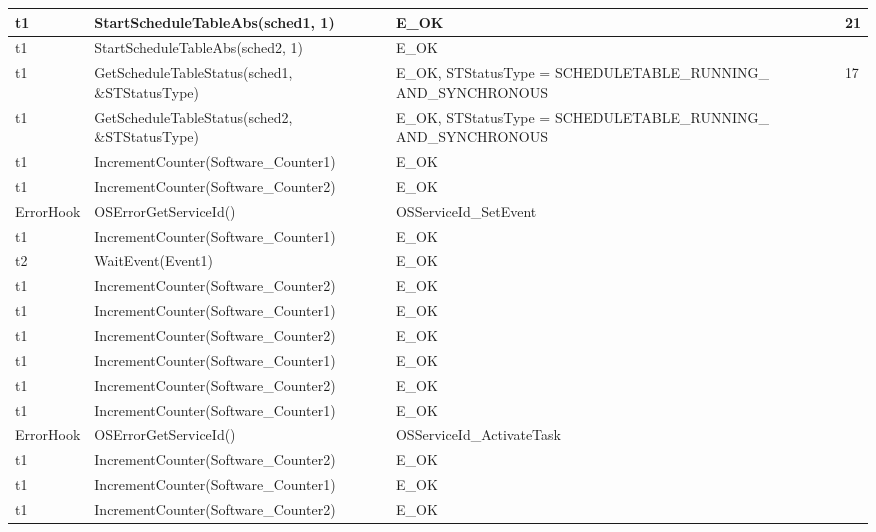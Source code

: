 \documentclass[10pt]{article}
\newlength{\Li}\settowidth{\Li}{Running}
\newlength{\Lii}\setlength{\Lii}{7cm}
\newlength{\Liiii}\setlength{\Liiii}{0.9cm}
\newlength{\Liii}\setlength{\Liii}{\textwidth} \addtolength{\Liii}{-\Li} \addtolength{\Liii}{-\Lii} \addtolength{\Liii}{-\Liiii}
\begin{document}
	\begin{supertabular}{|p{\Li}|p{\Lii}|p{\Liii}|p{\Liiii}|} \hline 
	t1		& StartScheduleTableAbs(sched1, 1)									& E\_OK																	& 21 \\ \hline
	t1		& StartScheduleTableAbs(sched2, 1)									& E\_OK																	& \\ \hline
	t1		& GetScheduleTableStatus(sched1, \&STStatusType)						& E\_OK, STStatusType = SCHEDULETABLE\_RUNNING\_ AND\_SYNCHRONOUS		& 17 \\ \hline
	t1		& GetScheduleTableStatus(sched2, \&STStatusType)						& E\_OK, STStatusType = SCHEDULETABLE\_RUNNING\_ AND\_SYNCHRONOUS		& \\ \hline
	t1		& IncrementCounter(Software\_Counter1)								& E\_OK																	& \\ \hline
	t1		& IncrementCounter(Software\_Counter2)								& E\_OK																	& \\ \hline
	ErrorHook	& OSErrorGetServiceId()												& OSServiceId\_SetEvent														& \\ \hline
	t1		& IncrementCounter(Software\_Counter1)								& E\_OK																	& \\ \hline
	t2		& WaitEvent(Event1)													& E\_OK																	& \\ \hline
	t1		& IncrementCounter(Software\_Counter2)								& E\_OK																	& \\ \hline
	t1		& IncrementCounter(Software\_Counter1)								& E\_OK																	& \\ \hline
	t1		& IncrementCounter(Software\_Counter2)								& E\_OK																	& \\ \hline
	t1		& IncrementCounter(Software\_Counter1)								& E\_OK																	& \\ \hline
	t1		& IncrementCounter(Software\_Counter2)								& E\_OK																	& \\ \hline
	t1		& IncrementCounter(Software\_Counter1)								& E\_OK																	& \\ \hline
	ErrorHook	& OSErrorGetServiceId()												& OSServiceId\_ActivateTask													& \\ \hline
	t1		& IncrementCounter(Software\_Counter2)								& E\_OK																	& \\ \hline
	t1		& IncrementCounter(Software\_Counter1)								& E\_OK																	& \\ \hline
	t1		& IncrementCounter(Software\_Counter2)								& E\_OK																	& \\ \hline

\end{supertabular}
\end{document}
